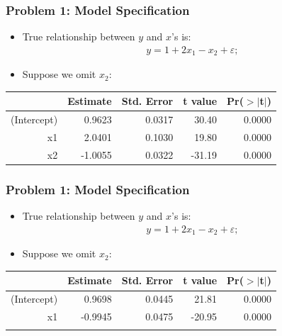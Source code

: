 \documentclass[aspectratio=169]{beamer}
\theoremstyle{principle}
\begin{document}
\begin{frame}
\frametitle{Problem 1: Model Specification}
\begin{itemize}
\item True relationship between $y$ and $x$'s is:
\begin{align*}
y = 1 + 2x_1 - x_2 + \varepsilon;
\end{align*}
\item[]\color{white} Suppose we omit $x_2$:
\end{itemize}

\begin{table}[ht]
\centering
\begin{tabular}{rrrrr}
  \hline
  \hline
 & Estimate & Std. Error & t value & Pr($>$$|$t$|$) \\ 
  \hline
    \hline
(Intercept) & 0.9623 & 0.0317 & 30.40 & 0.0000 \\ 
  x1 & 2.0401 & 0.1030 & 19.80 & 0.0000 \\ 
  x2 & -1.0055 & 0.0322 & -31.19 & 0.0000 \\ 
   \hline
      \hline
\end{tabular}
\end{table}

\end{frame}

\begin{frame}
\frametitle{Problem 1: Model Specification}
\begin{itemize}
\item True relationship between $y$ and $x$'s is:
\begin{align*}
y = 1 + 2x_1 - x_2 + \varepsilon;
\end{align*}
\item Suppose we omit $x_2$:
\end{itemize}

\begin{table}[ht]
\centering
\begin{tabular}{rrrrr}
  \hline
  \hline
 & Estimate & Std. Error & t value & Pr($>$$|$t$|$) \\ 
  \hline
    \hline
(Intercept) & 0.9698 & 0.0445 & 21.81 & 0.0000 \\ 
  x1 & -0.9945 & 0.0475 & -20.95 & 0.0000 \\ 
   \hline
      \hline
      &&&&\\
\end{tabular}
\end{table}

\end{frame}
\end{document}

